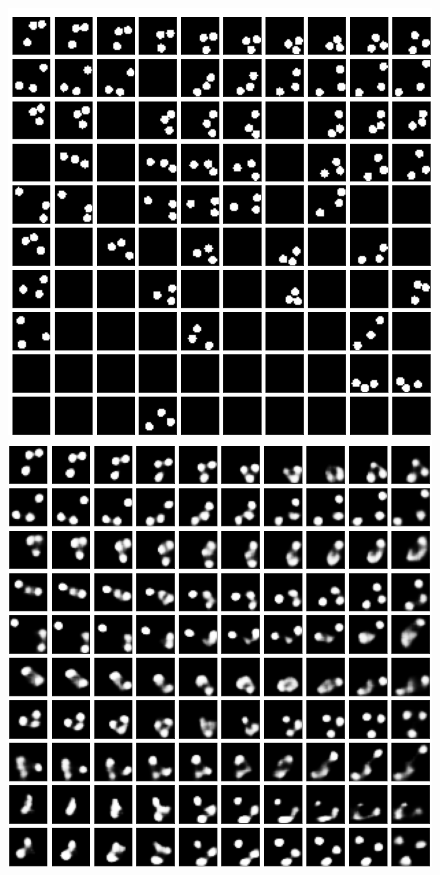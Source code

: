 \begin{frame}
\begin{figure}[h!]
		\begin{minipage}{0.32\textwidth}
			\center
			\includegraphics[scale=0.12]{Bilder/bouncingBalls_VAE}
		\end{minipage}
		\begin{minipage}{0.32\textwidth}
			\center
			\includegraphics[scale=0.12]{Bilder/bouncingBalls_VAElat}

\end{minipage}
\end{figure}
\end{frame}
